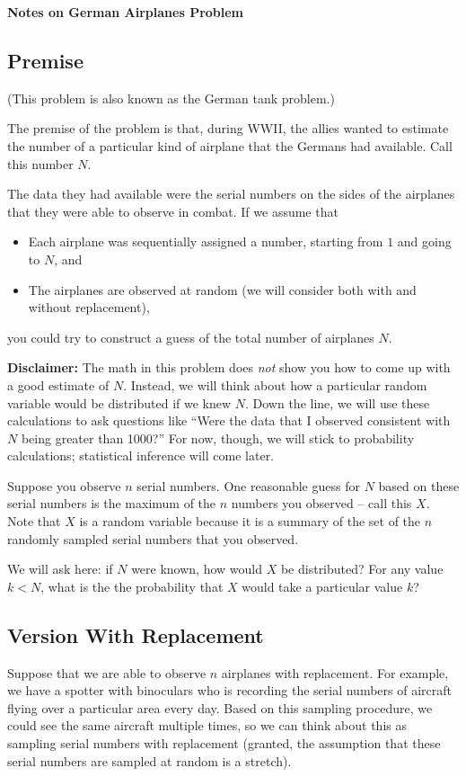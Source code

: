 \documentclass[11pt]{article}
\begin{document}
\centerline{\textbf{Notes on German Airplanes Problem}}
\subsection*{Premise}
(This problem is also known as the German tank problem.)

The premise of the problem is that, during WWII, the allies wanted to estimate the number of
a particular kind of airplane that the Germans had available. Call this number $N$.

The data they had available were the serial numbers on the sides of the airplanes that they
were able to observe in combat. If we assume that
\begin{itemize}
    \item Each airplane was sequentially assigned a number, starting from $1$ and going to $N$, and
    \item The airplanes are observed at random (we will consider both with and without replacement),
\end{itemize}
you could try to construct a guess of the total number of airplanes $N$.

{\bf Disclaimer:} The math in this problem does \emph{not} show you how to come up with a good estimate of
$N$. Instead, we will think about how a particular random variable would be distributed if we knew
$N$. Down the line, we will use these calculations to ask questions like ``Were the data that I observed
consistent with $N$ being greater than 1000?'' For now, though, we will stick to probability calculations;
statistical inference will come later.

Suppose you observe $n$ serial numbers. One reasonable guess for $N$ based on these serial numbers
is the maximum of the $n$ numbers you observed -- call this $X$. Note that $X$ is a random variable
because it is a summary of the set of the $n$ randomly sampled serial numbers that you observed.

We will ask here: if $N$ were known, how would $X$ be distributed? For any value $k < N$, what
is the the probability that $X$ would take a particular value $k$?

\subsection*{Version With Replacement}
Suppose that we are able to observe $n$ airplanes with replacement. For example, we have a spotter with
binoculars who is recording the serial numbers of aircraft flying over a particular area every day. Based on this
sampling procedure, we could see the same aircraft multiple times, so we can think about this as
sampling serial numbers with replacement (granted, the assumption that these serial numbers are sampled at random
is a stretch).
\end{document}
